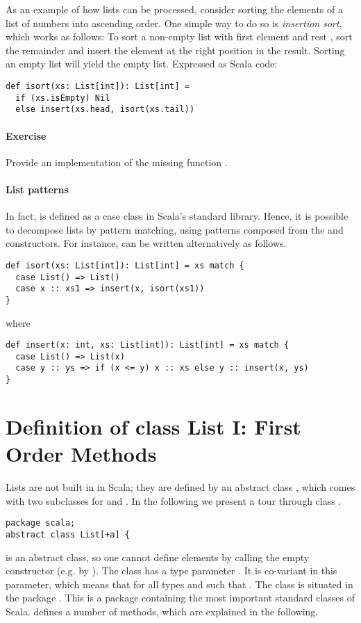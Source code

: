 \documentclass[a4paper,12pt,twoside,titlepage]{book}
\newcommand{\exercise}{\paragraph{Exercise}}
\begin{document}
As an example of how lists can be processed, consider sorting the
elements of a list of numbers into ascending order. One simple way to
do so is {\em insertion sort}, which works as follows: To sort a
non-empty list with first element  and rest , sort
the remainder  and insert the element  at the right
position in the result. Sorting an empty list will yield the
empty list. Expressed as Scala code:
\begin{lstlisting}
def isort(xs: List[int]): List[int] =
  if (xs.isEmpty) Nil
  else insert(xs.head, isort(xs.tail))
\end{lstlisting}

\exercise Provide an implementation of the missing function
.

\paragraph{List patterns} In fact, \code{::} is defined as a case
class in Scala's standard library. Hence, it is possible to decompose
lists by pattern matching, using patterns composed from the 
and \code{::} constructors. For instance,  can be written
alternatively as follows.
\begin{lstlisting}
def isort(xs: List[int]): List[int] = xs match {
  case List() => List()
  case x :: xs1 => insert(x, isort(xs1))
}
\end{lstlisting}
where
\begin{lstlisting}
def insert(x: int, xs: List[int]): List[int] = xs match {
  case List() => List(x)
  case y :: ys => if (x <= y) x :: xs else y :: insert(x, ys)
}
\end{lstlisting}

\section{Definition of class List I: First Order Methods}
\label{sec:list-first-order}

Lists are not built in in Scala; they are defined by an abstract class
, which comes with two subclasses for \code{::} and .
In the following we present a tour through class .
\begin{lstlisting}
package scala;
abstract class List[+a] {
\end{lstlisting}
 is an abstract class, so one cannot define elements by
calling the empty  constructor (e.g. by
).  The class has a type parameter . It is
co-variant in this parameter, which means that
 for all types  and  such that
.  The class is situated in the package
. This is a package containing the most important standard
classes of Scala.
  defines a number of methods, which are
explained in the following.
\end{document}
